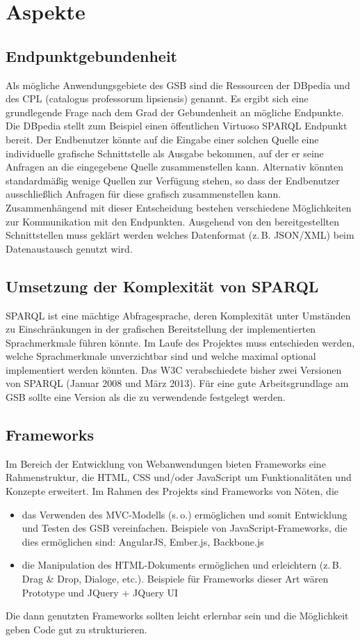 \section{Aspekte}

\subsection{Endpunktgebundenheit}
Als mögliche Anwendungsgebiete des GSB sind die Ressourcen der DBpedia und des CPL (catalogus professorum lipsiensis) genannt. Es ergibt sich eine grundlegende Frage nach dem Grad der Gebundenheit an mögliche Endpunkte. Die DBpedia stellt zum Beispiel einen öffentlichen Virtuoso SPARQL Endpunkt bereit. Der Endbenutzer könnte auf die Eingabe einer solchen Quelle eine individuelle grafische Schnittstelle als Ausgabe bekommen, auf der er seine Anfragen an die eingegebene Quelle zusammenstellen kann. Alternativ könnten standardmäßig wenige Quellen zur Verfügung stehen, so dass der Endbenutzer ausschließlich Anfragen für diese grafisch zusammenstellen kann.
Zusammenhängend mit dieser Entscheidung bestehen verschiedene Möglichkeiten zur Kommunikation mit den Endpunkten. Ausgehend von den bereitgestellten Schnittstellen muss geklärt werden welches Datenformat (z.\,B. JSON/XML) beim Datenaustausch genutzt wird. \cite{dbpedia-sparql,dbpedia-wiki}


\subsection{Umsetzung der Komplexität von SPARQL}
SPARQL ist eine mächtige Abfragesprache, deren Komplexität unter Umständen zu Einschränkungen in der grafischen Bereitstellung der implementierten Sprachmerkmale führen könnte. Im Laufe des Projektes muss entschieden werden, welche Sprachmerkmale unverzichtbar sind und welche maximal optional implementiert werden könnten. 
Das W3C verabschiedete bisher zwei Versionen von SPARQL (Januar 2008 und März 2013). Für eine gute Arbeitsgrundlage am GSB sollte eine Version als die zu verwendende festgelegt werden. \cite{w3c-rdf-sparql-query,w3c-sparql}


\subsection{Frameworks}
Im Bereich der Entwicklung von Webanwendungen bieten Frameworks eine Rahmenstruktur, die HTML, CSS und/oder JavaScript um Funktionalitäten und Konzepte erweitert. 
Im Rahmen des Projekts sind Frameworks von Nöten, die
\begin{itemize}
\item das Verwenden des MVC-Modells (s.\,o.) ermöglichen und somit Entwicklung und Testen des GSB vereinfachen. Beispiele von JavaScript-Frameworks, die dies ermöglichen sind: AngularJS, Ember.js, Backbone.js
\item die Manipulation des HTML-Dokuments ermöglichen und erleichtern (z.\,B. Drag \& Drop, Dialoge, etc.). Beispiele für Frameworks dieser Art wären Prototype und JQuery + JQuery UI
\end{itemize}
Die dann genutzten Frameworks sollten leicht erlernbar sein und die Möglichkeit geben Code gut zu strukturieren.


